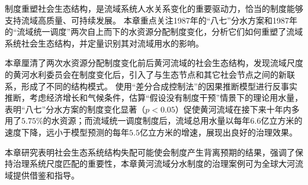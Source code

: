 制度重塑社会\textendash{}生态结构，是流域系统人\textendash{}水关系变化的重要驱动力，恰当的制度能够支持流域高质量、可持续发展。
本章重点关注1987年的“八七”分水方案和1987年的“流域统一调度”两次自上而下的水资源分配制度变化，分析它们如何重塑了流域系统社会\textendash{}生态结构，并定量识别其对流域用水的影响。

本章厘清了两次水资源分配制度变化前后黄河流域的社会\textendash{}生态结构，发现流域尺度的黄河水利委员会在制度变化后，引入了与生态节点和其它社会节点之间的新联系，形成了不同的结构模式。
使用“差分合成控制法”的因果推断模型进行反事实推断，考虑经济增长和气候条件，估算“假设没有制度干预”情景下的理论用水量，表明“八七”分水方案的制度变化显著（$p<0.05$）促使黄河流域在接下来十年内多用了$5.75\%$的水资源；而流域统一调度制度后，流域总用水量以每年$6.6$亿立方米的速度下降，远小于模型预测的每年$5.5$亿立方米的增速，展现出良好的治理效果。

本章研究表明社会\textendash{}生态系统结构失配可能使会制度产生背离预期的结果，强调了保持治理系统尺度匹配的重要性，本章黄河流域分水制度的治理案例可为全球大河流域提供借鉴和指导。
